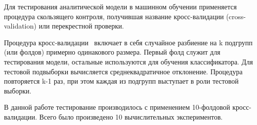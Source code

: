 Для тестирования аналитической модели в машинном обучении применяется процедура скользящего
контроля, получившая название кросс-валидации (cross-validation) или перекрестной проверки.

Процедура кросс-валидации~\cite{crossval} включает в себя случайное разбиение на k подгрупп (или фолдов) примерно
одинакового размера. Первый фолд служит для тестирования модели, остальные используются для обучения
классификатора. Для тестовой подвыборки вычисляется среднеквадратичное отклонение. Процедура повторяется k-1
раз, при этом каждая из подгрупп выступает в роли тестовой выборки.

В данной работе тестирование производилось с применением 10-фолдовой кросс-валидации. Всего было произведено
10 вычислительных экспериментов.